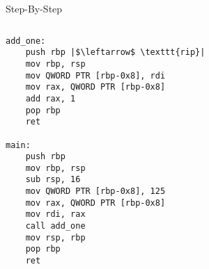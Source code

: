 \documentclass[hyphens,aspectratio=169]{beamer}
\begin{document}
\begin{frame}[fragile]{Step-By-Step}
    \begin{columns}
        \begin{column}{0.33\textwidth}
            \begin{verbatim}
add_one:
    push rbp |$\leftarrow$ \texttt{rip}|
    mov rbp, rsp
    mov QWORD PTR [rbp-0x8], rdi
    mov rax, QWORD PTR [rbp-0x8]
    add rax, 1
    pop rbp
    ret

main:
    push rbp
    mov rbp, rsp
    sub rsp, 16
    mov QWORD PTR [rbp-0x8], 125
    mov rax, QWORD PTR [rbp-0x8]
    mov rdi, rax
    call add_one
    mov rsp, rbp
    pop rbp
    ret
            \end{verbatim}
        \end{column}
        \begin{column}{0.33\textwidth}
\end{column}
\end{columns}
\end{frame}
\end{document}
